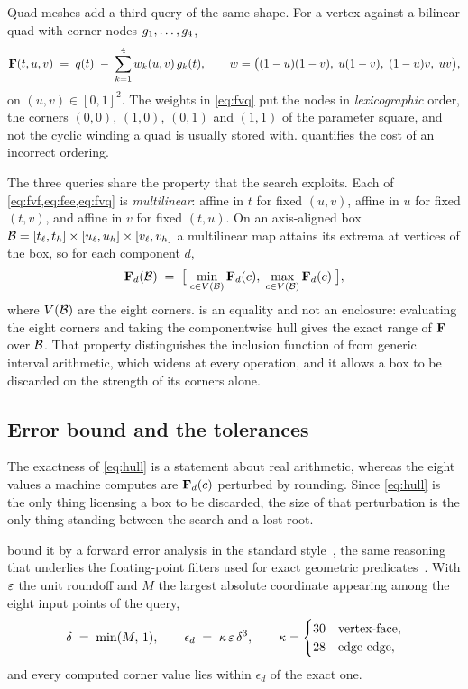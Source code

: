Quad meshes add a third query of the same shape. For a vertex against a
bilinear quad with corner nodes $g_{1},\dots,g_{4}$,
\begin{equation}
\label{eq:fvq}
\mathbf{F}(t,u,v) \;=\; q(t) \;-\; \sum_{k=1}^{4} w_{k}(u,v)\,
g_{k}(t), \qquad
w = \bigl((1-u)(1-v),\; u(1-v),\; (1-u)v,\; uv\bigr),
\end{equation}
on $(u,v)\in[0,1]^{2}$. The weights in \cref{eq:fvq} put the nodes in
\emph{lexicographic} order, the corners $(0,0)$, $(1,0)$, $(0,1)$ and $(1,1)$ of
the parameter square, and not the cyclic winding a quad is usually stored with.
 quantifies the cost of an incorrect ordering.

The three queries share the property that the search exploits. Each of
\cref{eq:fvf,eq:fee,eq:fvq} is \emph{multilinear}: affine in $t$ for fixed
$(u,v)$, affine in $u$ for fixed $(t,v)$, and affine in $v$ for fixed $(t,u)$.
On an axis-aligned box $\mathcal{B} =
[t_{\ell},t_{h}]\times[u_{\ell},u_{h}]\times[v_{\ell},v_{h}]$ a multilinear map
attains its extrema at vertices of the box, so for each component $d$,
\begin{equation}
\label{eq:hull}
\mathbf{F}_{d}(\mathcal{B}) \;=\; \bigl[\;\min_{c \in V(\mathcal{B})} \mathbf{F}_{d}(c),\;
\max_{c \in V(\mathcal{B})} \mathbf{F}_{d}(c)\;\bigr],
\end{equation}
where $V(\mathcal{B})$ are the eight corners.  is an equality and not an
enclosure: evaluating the eight corners and taking the componentwise hull gives
the exact range of $\mathbf{F}$ over $\mathcal{B}$. That property distinguishes the
inclusion function of \citet{wang2021tight} from generic interval arithmetic,
which widens at every operation, and it allows a box to be discarded on the
strength of its corners alone.

\subsection{Error bound and the tolerances}
\label{sec:prelim:err}

The exactness of \cref{eq:hull} is a statement about real arithmetic, whereas
the eight values a machine computes are $\mathbf{F}_{d}(c)$ perturbed by rounding.
Since \cref{eq:hull} is the only thing licensing a box to be discarded, the size
of that perturbation is the only thing standing between the search and a lost
root.

\citet{wang2021tight} bound it by a forward error analysis in the standard
style~\citep{higham2002accuracy}, the same reasoning that underlies the
floating-point filters used for exact geometric
predicates~\citep{attene2020indirect}. With $\varepsilon$ the unit roundoff and $M$
the largest absolute coordinate appearing among the eight input points of the
query,
\begin{equation}
\label{eq:err}
\delta \;=\; \min(M,\,1),
\qquad
\epsilon_{d} \;=\; \kappa\,\varepsilon\,\delta^{3},
\qquad
\kappa = \begin{cases}
30 & \text{vertex-face},\\
28 & \text{edge-edge},
\end{cases}
\end{equation}
and every computed corner value lies within $\epsilon_{d}$ of the exact one.

